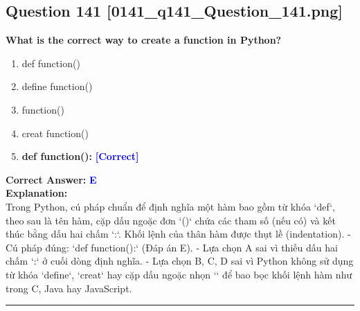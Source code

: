\documentclass[11pt,a4paper]{article}
\begin{document}
\begin{minipage}{\textwidth}
\subsection*{Question 141 \quad \footnotesize{[0141_q141_Question_141.png]}}
\noindent \textbf{What is the correct way to create a function in Python?}

\begin{enumerate}[label=\Alph*.]
    \item def function()
    \item define function()
    \item function()
    \item creat function()
    \item \textbf{def function():} \hfill \textcolor{blue}{\textbf{[Correct]}}
\end{enumerate}

\noindent \textbf{Correct Answer:} \textcolor{blue}{\textbf{E}} \\[4pt]
\noindent \textbf{Explanation:}\\
Trong Python, cú pháp chuẩn để định nghĩa một hàm bao gồm từ khóa `def`, theo sau là tên hàm, cặp dấu ngoặc đơn `()` chứa các tham số (nếu có) và kết thúc bằng dấu hai chấm `:`. Khối lệnh của thân hàm được thụt lề (indentation).\newline
- Cú pháp đúng: `def function():` (Đáp án E).\newline
- Lựa chọn A sai vì thiếu dấu hai chấm `:` ở cuối dòng định nghĩa.\newline
- Lựa chọn B, C, D sai vì Python không sử dụng từ khóa `define`, `creat` hay cặp dấu ngoặc nhọn `{}` để bao bọc khối lệnh hàm như trong C, Java hay JavaScript.
\end{minipage}
\vspace{0.8cm}
\hrule
\vspace{0.5cm}
\end{document}
